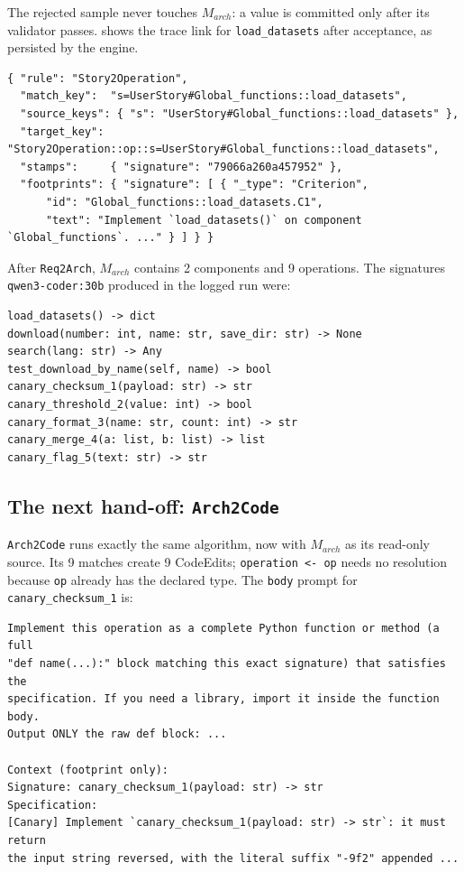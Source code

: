 \documentclass[10pt,a4paper]{article}
\newcommand{\TL}{\mathit{TL}}
\newcommand{\cls}[1]{\textsf{#1}}
\newcommand{\code}[1]{\texttt{#1}}
\theoremstyle{definition}
\begin{document}
The rejected sample never touches $M_{\mathit{arch}}$: a value is committed
only after its validator passes.  shows the trace link
for \code{load_datasets} after acceptance, as persisted by the engine.

\begin{lstlisting}[style=engine, caption={A persisted trace link of $\TL_{\code{Req2Arch}}$, with its stamp.}, label={lst:trace-link}]
{ "rule": "Story2Operation",
  "match_key":  "s=UserStory#Global_functions::load_datasets",
  "source_keys": { "s": "UserStory#Global_functions::load_datasets" },
  "target_key": "Story2Operation::op::s=UserStory#Global_functions::load_datasets",
  "stamps":     { "signature": "79066a260a457952" },
  "footprints": { "signature": [ { "_type": "Criterion",
      "id": "Global_functions::load_datasets.C1",
      "text": "Implement `load_datasets()` on component `Global_functions`. ..." } ] } }
\end{lstlisting}

After \code{Req2Arch}, $M_{\mathit{arch}}$ contains 2 components and 9
operations. The signatures \texttt{qwen3-coder:30b} produced in the logged
run were:

\begin{lstlisting}[style=llm]
load_datasets() -> dict
download(number: int, name: str, save_dir: str) -> None
search(lang: str) -> Any
test_download_by_name(self, name) -> bool
canary_checksum_1(payload: str) -> str
canary_threshold_2(value: int) -> bool
canary_format_3(name: str, count: int) -> str
canary_merge_4(a: list, b: list) -> list
canary_flag_5(text: str) -> str
\end{lstlisting}

\subsection{The next hand-off: \code{Arch2Code}}\label{sec:step4-code}

\code{Arch2Code} runs exactly the same algorithm, now with
$M_{\mathit{arch}}$ as its read-only source. Its 9 matches create 9
\cls{CodeEdit}s; \code{operation <- op} needs no resolution because
\code{op} already has the declared type. The \code{body} prompt for
\code{canary_checksum_1} is:

\begin{lstlisting}[style=llm, caption={Prompt for (\code{ce canary_checksum_1}, \code{body}): signature plus the carried-forward criterion.}]
Implement this operation as a complete Python function or method (a full
"def name(...):" block matching this exact signature) that satisfies the
specification. If you need a library, import it inside the function body.
Output ONLY the raw def block: ...

Context (footprint only):
Signature: canary_checksum_1(payload: str) -> str
Specification:
[Canary] Implement `canary_checksum_1(payload: str) -> str`: it must return
the input string reversed, with the literal suffix "-9f2" appended ...
\end{lstlisting}
\end{document}
